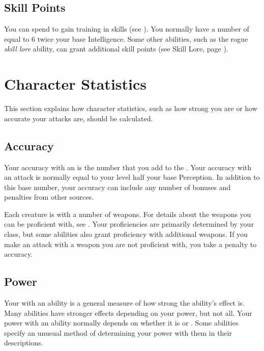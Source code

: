     \subsection{Skill Points}\label{Skill Points}
        You can spend  to gain training in skills (see ).
        You normally have a number of  equal to 6 \add twice your base Intelligence.
        Some other abilities, such as the rogue \textit{skill lore} ability, can grant additional skill points (see Skill Lore, page ).

\section{Character Statistics}
    This section explains how character statistics, such as how strong you are or how accurate your attacks are, should be calculated.

    \subsection{Accuracy}\label{Accuracy}
        Your accuracy with an  is the number that you add to the .
        Your accuracy with an attack is normally equal to your level \add half your base Perception.
        In addition to this base number, your accuracy can include any number of bonuses and penalties from other sources.

         Each creature is  with a number of weapons.
        For details about the weapons you can be proficient with, see .
        Your proficiencies are primarily determined by your class, but some abilities also grant proficiency with additional weapons.
        If you make an attack with a weapon you are not proficient with, you take a  penalty to accuracy.

    \subsection{Power}\label{Power}
        Your  with an ability is a general measure of how strong the ability's effect is.
        Many abilities have stronger effects depending on your power, but not all.
        Your power with an ability normally depends on whether it is  or .
        Some abilities specify an unusual method of determining your power with them in their descriptions.

